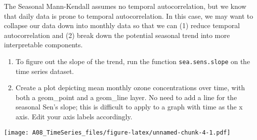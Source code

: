 \documentclass[]{article}
\newenvironment{Shaded}{\begin{snugshade}}{\end{snugshade}}
\newcommand{\CommentTok}[1]{\textcolor[rgb]{0.56,0.35,0.01}{\textit{#1}}}
\newcommand{\DataTypeTok}[1]{\textcolor[rgb]{0.13,0.29,0.53}{#1}}
\newcommand{\FloatTok}[1]{\textcolor[rgb]{0.00,0.00,0.81}{#1}}
\newcommand{\KeywordTok}[1]{\textcolor[rgb]{0.13,0.29,0.53}{\textbf{#1}}}
\newcommand{\NormalTok}[1]{#1}
\newcommand{\OperatorTok}[1]{\textcolor[rgb]{0.81,0.36,0.00}{\textbf{#1}}}
\newcommand{\StringTok}[1]{\textcolor[rgb]{0.31,0.60,0.02}{#1}}
\begin{document}
The Seasonal Mann-Kendall assumes no temporal autocorrelation, but we
know that daily data is prone to temporal autocorrelation. In this case,
we may want to collapse our data down into monthly data so that we can
(1) reduce temporal autocorrelation and (2) break down the potential
seasonal trend into more interpretable components.

\begin{enumerate}
\def\labelenumi{\arabic{enumi}.}
\setcounter{enumi}{11}
\item
  To figure out the slope of the trend, run the function
  \texttt{sea.sens.slope} on the time series dataset.
\item
  Create a plot depicting mean monthly ozone concentrations over time,
  with both a geom\_point and a geom\_line layer. No need to add a line
  for the seasonal Sen's slope; this is difficult to apply to a graph
  with time as the x axis. Edit your axis labels accordingly.
\end{enumerate}

\begin{Shaded}
\end{Shaded}

\texttt{[image: A08\_TimeSeries\_files/figure-latex/unnamed-chunk-4-1.pdf]}
\end{document}
